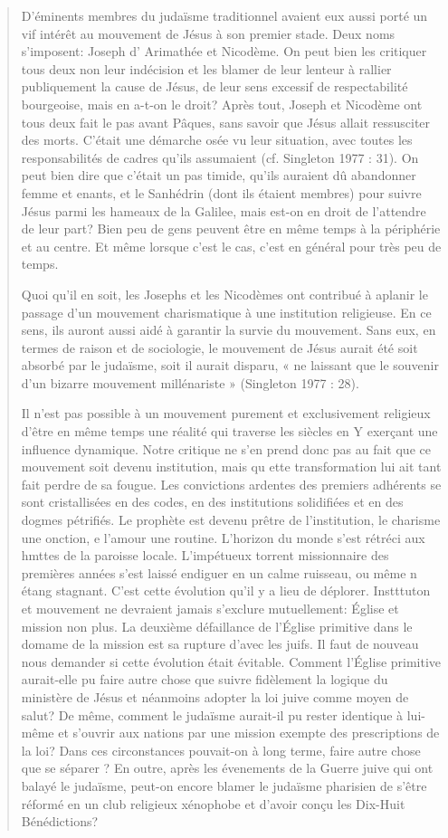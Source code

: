 \begin{quote} 
  D'éminents membres du judaïsme traditionnel avaient eux aussi
porté un vif intérêt au mouvement de Jésus à son premier stade. Deux
noms s'imposent: Joseph d' Arimathée et Nicodème. On peut bien les critiquer tous deux non leur indécision et les blamer de leur lenteur à rallier publiquement la cause de Jésus, de leur sens excessif de  respectabilité bourgeoise, mais en a-t-on le droit? Après tout, Joseph
et Nicodème ont tous deux fait le pas avant Pâques, sans savoir que
Jésus allait ressusciter des morts. C'était une démarche osée vu leur
situation, avec toutes les responsabilités de cadres qu'ils assumaient
(cf. Singleton 1977 : 31). On peut bien dire que c'était un pas timide,
qu'ils auraient dû abandonner femme et enants, et le Sanhédrin (dont
ils étaient membres) pour suivre Jésus parmi les hameaux de la Galilee,
mais est-on en droit de l'attendre de leur part? Bien peu de gens
peuvent être en même temps à la périphérie et au centre. Et même
lorsque c'est le cas, c'est en général pour très peu de temps.


Quoi qu'il en soit, les Josephs et les Nicodèmes ont contribué à
aplanir le passage d'un mouvement charismatique à une institution
religieuse. En ce sens, ils auront aussi aidé à garantir la survie du
mouvement. Sans eux, en termes de raison et de sociologie, le
mouvement de Jésus aurait été soit absorbé par le judaïsme, soit il
aurait disparu, « ne laissant que le souvenir d'un bizarre mouvement
millénariste » (Singleton 1977 : 28).

Il n'est pas possible à un mouvement purement et exclusivement
religieux d'être en même temps une réalité qui traverse les siècles en Y
exerçant une influence dynamique. Notre critique ne s'en prend donc
pas au fait que ce mouvement soit devenu institution, mais qu ette
transformation lui ait tant fait perdre de sa fougue. Les convictions
ardentes des premiers adhérents se sont cristallisées en des codes, en
des institutions solidifiées et en des dogmes pétrifiés. Le prophète est
devenu prêtre de l'institution, le charisme une onction, e l'amour
une routine. L'horizon du monde s'est rétréci aux hmttes de la
paroisse locale. L'impétueux torrent missionnaire des premières
années s'est laissé endiguer en un calme ruisseau, ou même n étang
stagnant. C'est cette évolution qu'il y a lieu de déplorer. Instttuton et
mouvement ne devraient jamais s'exclure mutuellement: Église et
mission non plus. 
La deuxième défaillance de l'Église primitive dans le domame de
la mission est sa rupture d'avec les juifs. Il faut de nouveau nous
demander si cette évolution était évitable. Comment l'Église primitive
aurait-elle pu faire autre chose que suivre fidèlement la logique du
ministère de Jésus et néanmoins adopter la loi juive comme moyen de
salut? De même, comment le judaïsme aurait-il pu rester identique à
lui-même et s'ouvrir aux nations par une mission exempte des
prescriptions de la loi? Dans ces circonstances pouvait-on à long
terme, faire autre chose que se séparer ? En outre, après les évenements
de la Guerre juive qui ont balayé le judaïsme, peut-on encore blamer
le judaïsme pharisien de s'être réformé en un club religieux
xénophobe et d'avoir conçu les Dix-Huit Bénédictions?
\end{quote}

